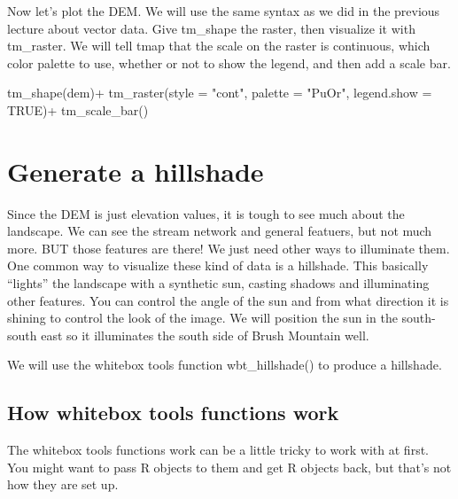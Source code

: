 \documentclass[
]{book}
\newenvironment{Shaded}{\begin{snugshade}}{\end{snugshade}}
\newcommand{\AttributeTok}[1]{\textcolor[rgb]{0.77,0.63,0.00}{#1}}
\newcommand{\ConstantTok}[1]{\textcolor[rgb]{0.00,0.00,0.00}{#1}}
\newcommand{\FunctionTok}[1]{\textcolor[rgb]{0.00,0.00,0.00}{#1}}
\newcommand{\NormalTok}[1]{#1}
\newcommand{\SpecialCharTok}[1]{\textcolor[rgb]{0.00,0.00,0.00}{#1}}
\newcommand{\StringTok}[1]{\textcolor[rgb]{0.31,0.60,0.02}{#1}}
\begin{document}
Now let's plot the DEM. We will use the same syntax as we did in the previous lecture about vector data. Give tm\_shape the raster, then visualize it with tm\_raster. We will tell tmap that the scale on the raster is continuous, which color palette to use, whether or not to show the legend, and then add a scale bar.

\begin{Shaded}
\begin{Highlighting}[]
\FunctionTok{tm\_shape}\NormalTok{(dem)}\SpecialCharTok{+}
  \FunctionTok{tm\_raster}\NormalTok{(}\AttributeTok{style =} \StringTok{"cont"}\NormalTok{, }\AttributeTok{palette =} \StringTok{"PuOr"}\NormalTok{, }\AttributeTok{legend.show =} \ConstantTok{TRUE}\NormalTok{)}\SpecialCharTok{+}
  \FunctionTok{tm\_scale\_bar}\NormalTok{()}
\end{Highlighting}
\end{Shaded}

\hypertarget{generate-a-hillshade}{%
\section{Generate a hillshade}\label{generate-a-hillshade}}

Since the DEM is just elevation values, it is tough to see much about the landscape. We can see the stream network and general featuers, but not much more. BUT those features are there! We just need other ways to illuminate them. One common way to visualize these kind of data is a hillshade. This basically ``lights'' the landscape with a synthetic sun, casting shadows and illuminating other features. You can control the angle of the sun and from what direction it is shining to control the look of the image. We will position the sun in the south-south east so it illuminates the south side of Brush Mountain well.

We will use the whitebox tools function wbt\_hillshade() to produce a hillshade.

\hypertarget{how-whitebox-tools-functions-work}{%
\subsection{How whitebox tools functions work}\label{how-whitebox-tools-functions-work}}

The whitebox tools functions work can be a little tricky to work with at first. You might want to pass R objects to them and get R objects back, but that's not how they are set up.
\end{document}

